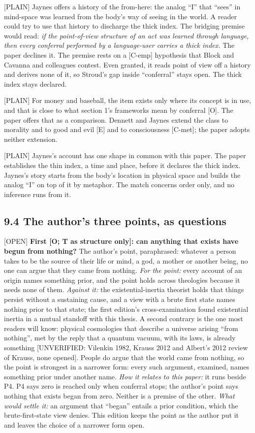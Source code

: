 \documentclass[11pt]{article}
\newcommand{\register}[1]{{\ttfamily\small #1}}
\begin{document}
\register{[PLAIN]} Jaynes offers a history of the from-here: the analog ``I'' that ``sees'' in mind-space was learned from the body's way of seeing in the world. A reader could try to use that history to discharge the thick index. The bridging premise would read: \emph{if the point-of-view structure of an act was learned through language, then every conferral performed by a language-user carries a thick index.} The paper declines it. The premise rests on a [C-emp] hypothesis that Block and Cavanna and colleagues contest. Even granted, it reads point of view off a history and derives none of it, so Stroud's gap inside ``conferral'' stays open. The thick index stays declared.

\register{[PLAIN]} For money and baseball, the item exists only where its concept is in use, and that is close to what section 1's frameworks mean by conferral [O]. The paper offers that as a comparison. Dennett and Jaynes extend the class to morality and to good and evil [E] and to consciousness [C-met]; the paper adopts neither extension.

\register{[PLAIN]} Jaynes's account has one shape in common with this paper. The paper establishes the thin index, a time and place, before it declares the thick index. Jaynes's story starts from the body's location in physical space and builds the analog ``I'' on top of it by metaphor. The match concerns order only, and no inference runs from it.

\subsection*{9.4 The author's three points, as questions}

\register{[OPEN]} \textbf{First [O; T as structure only]: can anything that exists have begun from nothing?} The author's point, paraphrased: whatever a person takes to be the source of their life or mind, a god, a mother or another being, no one can argue that they came from nothing. \emph{For the point:} every account of an origin names something prior, and the point holds across theologies because it needs none of them. \emph{Against it:} the existential-inertia theorist holds that things persist without a sustaining cause, and a view with a brute first state names nothing prior to that state; the first edition's cross-examination found existential inertia in a mutual standoff with this thesis. A second contrary is the one most readers will know: physical cosmologies that describe a universe arising ``from nothing'', met by the reply that a quantum vacuum, with its laws, is already something [UNVERIFIED: Vilenkin 1982, Krauss 2012 and Albert's 2012 review of Krauss, none opened]. People do argue that the world came from nothing, so the point is strongest in a narrower form: every such argument, examined, names something prior under another name. \emph{How it relates to this paper:} it runs beside P4. P4 says zero is reached only when conferral stops; the author's point says nothing that exists began from zero. Neither is a premise of the other. \emph{What would settle it:} an argument that ``began'' entails a prior condition, which the brute-first-state view denies. This edition keeps the point as the author put it and leaves the choice of a narrower form open.
\end{document}
